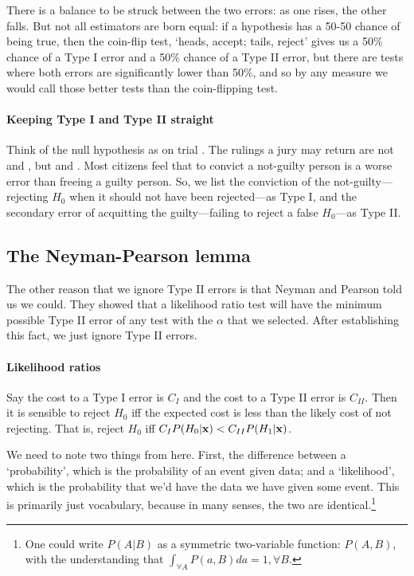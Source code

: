 There
is a balance to be struck between the two errors: as one rises, the
other falls. But not all estimators are born equal: if a hypothesis has a 50-50 chance of being true, then the coin-flip test, `heads, accept;
tails, reject' gives us a 50\% chance of a Type I error
and a 50\% chance of a Type II error, but there are tests where both
errors are significantly lower than 50\%, and so by any measure we would
call those better tests than the coin-flipping test. 

\paragraph{Keeping Type I and Type II straight} 
 

Think of the null hypothesis as on
trial \citep[pp 112--113]{kmenta}.  The rulings a jury may return are
not  and , but  and . Most citizens feel that to convict a not-guilty person is a worse
error than freeing a guilty person. So, we list the conviction of the
not-guilty---rejecting $H_0$ when it should not have been rejected---as
Type I, and the secondary error of acquitting the guilty---failing to
reject a false $H_0$---as Type II.


\subsection{The Neyman-Pearson lemma}  
The other reason that we ignore Type II errors is that Neyman and Pearson
told us we could.  They showed that a likelihood ratio test will have
the minimum possible Type II error of any test with the $\alpha$ that
we selected. After establishing this fact, we just ignore Type II errors.

\paragraph{Likelihood ratios} 

Say the cost to a Type I error is $C_I$ and the cost to a Type II error
is $C_{II}$.  Then it is sensible to reject $H_0$ iff the expected cost is less
than the likely cost of not rejecting. That is, reject $H_0$ iff $C_I
P(H_0|{\bf x})<C_{II} P(H_1|{\bf x})$.

We need to note two things from here. First, the difference between a
`probability', which is the probability of an event given data; and a
`likelihood', which is the probability that we'd have the data we have
given some event. This is primarily just vocabulary, because in many
senses, the two are identical.\footnote{One could write $P(A|B)$ as a symmetric two-variable function:
$P(A,B)$, with the understanding that $\int_{\forall A} P(a,B)da = 1,
\forall B$.} 

